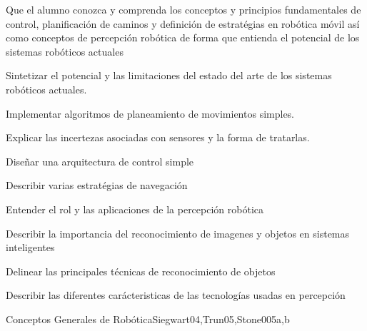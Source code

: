 \begin{syllabus}


\begin{justification}
Que el alumno conozca y comprenda los conceptos y principios fundamentales de control, planificación de caminos y
definición de estratégias en robótica móvil así como conceptos de percepción robótica de forma que entienda el potencial
de los sistemas robóticos actuales
\end{justification}

\begin{goals}
\item Sintetizar el potencial y las limitaciones del estado del arte de los sistemas robóticos actuales.
\item Implementar algoritmos de planeamiento de movimientos simples.
\item Explicar las incertezas asociadas con sensores y la forma de tratarlas.
\item Diseñar una arquitectura de control simple
\item Describir varias estratégias de navegación
\item Entender el rol y las aplicaciones de la percepción robótica
\item Describir la importancia del reconocimiento de imagenes y objetos en sistemas inteligentes
\item Delinear las principales técnicas de reconocimiento de objetos
\item Describir las diferentes carácteristicas de las tecnologías usadas en percepción
\end{goals}



\begin{unit}{\ISRobotics}{Conceptos Generales de Robótica}{Siegwart04,Trun05,Stone00}{5}{a,b}
\begin{topics}%
	\item \ISRoboticsTopicOverview
	\item \ISRoboticsTopicConfiguration
\end{topics}
\begin{learningoutcomes}
  
	\item \ISRoboticsLOListCapabilities [\Familiarity]
	\item \ISRoboticsLOIntegrate [\Usage]
\end{learningoutcomes}
\end{unit}


\end{syllabus}
